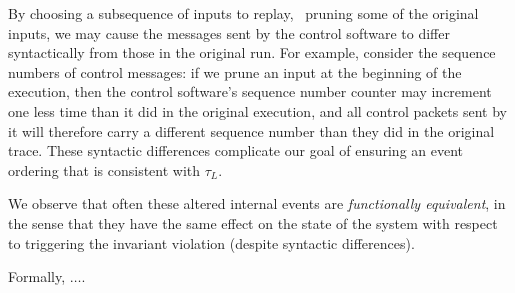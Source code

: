 By choosing a subsequence of inputs to replay, \ie~pruning some of the original inputs,
we may cause the messages sent by the control software to differ syntactically
from those in the original run. For example, consider the sequence numbers of control
messages: if we prune an input at the beginning of the execution, then the
control software's sequence number counter may increment one less time than it
did in the original execution, and all
control packets sent by it will therefore carry a different sequence number
than they did in the original trace. These syntactic differences complicate
our goal of ensuring an event ordering that is consistent with $\tau_L$.

We observe that often these altered internal events are {\em functionally
equivalent}, in the sense that they
have the same effect on the state of the system with respect to triggering the
invariant violation (despite syntactic differences).

Formally, $\dots$.
